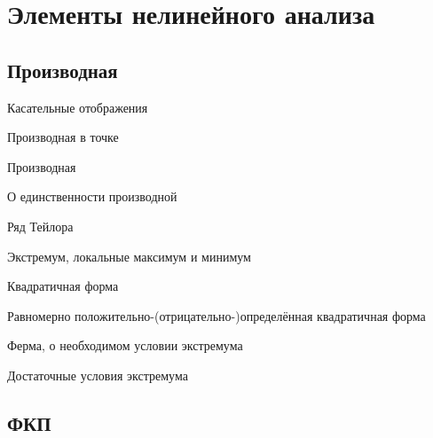 \section{Элементы нелинейного анализа}

\subsection{Производная}
\begin{dfn}{Касательные отображения}
\end{dfn}

\begin{dfn}{Производная в точке}
\end{dfn}

\begin{dfn}{Производная}
\end{dfn}

\begin{thm}{О единственности производной}
\end{thm}

\begin{dfn}{Ряд Тейлора}
\end{dfn}

\begin{dfn}{Экстремум, локальные максимум и минимум}
\end{dfn}

\begin{dfn}{Квадратичная форма}
\end{dfn}

\begin{dfn}{Равномерно положительно-(отрицательно-)определённая квадратичная форма}
\end{dfn}

\begin{thm}{Ферма, о необходимом условии экстремума}
\end{thm}

\begin{thm}{Достаточные условия экстремума}
\end{thm}

\subsection{ФКП}
